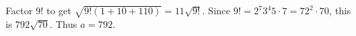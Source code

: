 Factor $9!$ to get $\sqrt{9!(1+10+110)}=11\sqrt{9!}$. Since $9!=2^7 3^4 5\cdot7=72^2\cdot70$, this is $792\sqrt{70}$. Thus $\boxed{a=792}$.
